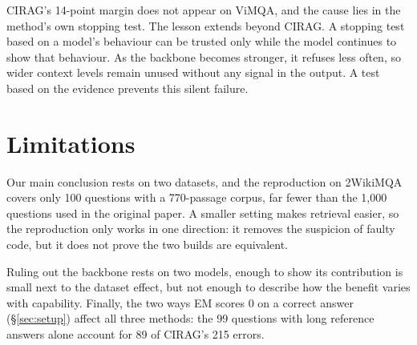 \documentclass[11pt]{article}
\begin{document}
CIRAG's 14-point margin does not appear on ViMQA, and the cause lies in the method's own
stopping test. The lesson extends beyond CIRAG. A stopping test based on a model's behaviour
can be trusted only while the model continues to show that behaviour. As the backbone
becomes stronger, it refuses less often, so wider context levels remain unused without any
signal in the output. A test based on the evidence prevents this silent failure.

\section*{Limitations}

Our main conclusion rests on two datasets, and the reproduction on 2WikiMQA covers only 100
questions with a 770-passage corpus, far fewer than the 1,000 questions used in the original paper.
A smaller setting makes retrieval easier, so the reproduction only works in one direction: it
removes the suspicion of faulty code, but it does not prove the two builds are equivalent.

Ruling out the backbone rests on two models, enough to show its contribution is small next to
the dataset effect, but not enough to describe how the benefit varies with capability. Finally, the two ways EM scores 0 on a correct answer
(\S\ref{sec:setup}) affect all three methods: the 99 questions with long reference answers
alone account for 89 of CIRAG's 215 errors.


\end{document}
